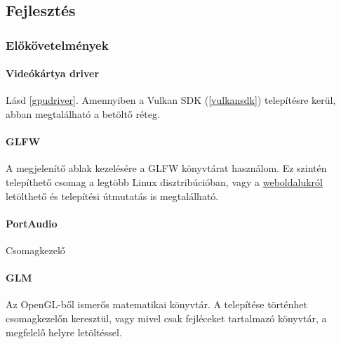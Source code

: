 
\subsection{Fejleszt\'es}
\subsubsection{El\H ok\"ovetelm\'enyek}
\paragraph{Vide\'ok\'artya driver}
L\'asd \ref{gpudriver}.
Amennyiben a Vulkan SDK (\ref{vulkansdk}) telep\'it\'esre ker\"ul, abban megtal\'alhat\'o a bet\"olt\H o r\'eteg.

\paragraph{GLFW}
A megjelen\'it\H o ablak kezel\'es\'ere a GLFW k\"onyvt\'arat haszn\'alom. Ez szint\'en telep\'ithet\H o csomag a legt\"obb Linux disztrib\'uci\'oban, vagy a \href{http://www.glfw.org/download.html}{weboldalukr\'ol} let\"olthet\H o \'es telep\'it\'esi \'utmutat\'as is megtal\'alhat\'o. 

\paragraph{PortAudio}
Csomagkezel\H o

\paragraph{GLM}
Az OpenGL-b\H ol ismer\H os matematikai k\"onyvt\'ar. 
A telep\'it\'ese t\"ort\'enhet csomagkezel\H on kereszt\"ul, vagy mivel csak fejl\'eceket tartalmaz\'o k\"onyvt\'ar, a megfelel\H o helyre let\"olt\'essel.

